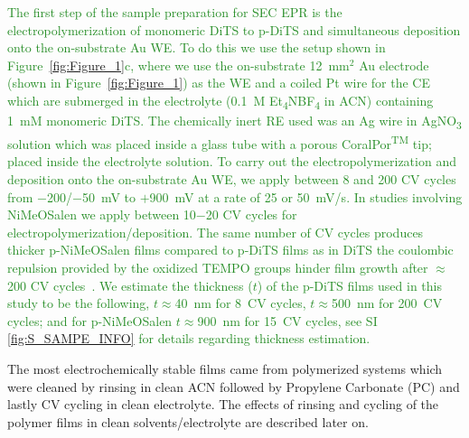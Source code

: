 \documentclass{WileyMSP-template}
\newcommand{\np}[1]{\textcolor{ForestGreen}{#1}}
\newcommand{\ik}[1]{\textcolor{RawSienna}{#1}}
\begin{document}
\np{
The first step of the sample preparation for SEC EPR is the electropolymerization of monomeric DiTS to p-DiTS and simultaneous deposition onto the on-substrate Au WE. To do this we use the setup shown in Figure~\ref{fig:Figure_1}c, where we use the on-substrate 12~mm$^2$ Au electrode (shown in Figure~\ref{fig:Figure_1}) as the WE and a coiled Pt wire for the CE which are submerged in the electrolyte (0.1~M Et\textsubscript{4}NBF\textsubscript{4} in ACN) containing 1~mM monomeric DiTS. The chemically inert RE used was an Ag wire in AgNO\textsubscript{3} solution which was placed inside a glass tube with a porous CoralPor\textsuperscript{TM} tip; placed inside the electrolyte solution. To carry out the electropolymerization and deposition onto the on-substrate Au WE, we apply between 8 and 200 CV cycles from $-$200/$-$50~mV to $+$900~mV at a rate of 25 or 50~mV/s. In studies involving NiMeOSalen we apply between 10$-$20 CV cycles for electropolymerization/deposition. The same number of CV cycles produces thicker p-NiMeOSalen films compared to p-DiTS films as in DiTS the coulombic repulsion provided by the oxidized TEMPO groups hinder film growth after $\approx$200 CV cycles~\cite{vereshchagin2020_battandsupercaps}. We estimate the thickness ($t$) of the p-DiTS films used in this study to be the following, $t\approx$40~nm for 8~CV cycles, $t\approx$500~nm for 200~CV cycles; and for p-NiMeOSalen $t\approx$900~nm for 15~CV cycles, see SI \ref{fig:S_SAMPE_INFO} for details regarding thickness estimation.
}

\bigbreak

The most electrochemically stable films came from polymerized systems which were cleaned by rinsing in clean ACN followed by Propylene Carbonate (PC) and lastly CV cycling in clean electrolyte. The effects of rinsing and cycling of the polymer films in clean solvents/electrolyte are described later on.

\bigbreak

\end{document}
